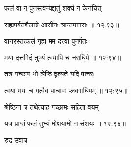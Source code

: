 {\devanagarifont फलं वा न पुनस्त्वन्यद्दातुं शक्यं न केनचित् \thinspace{\dandab} \dontdisplaylinenum }%


{\devanagarifont सह्यपर्वतशैलाग्रे आसीनः श्रान्तमानसः {॥ १२:९३॥} \veg\dontdisplaylinenum }%

{\devanagarifont वानरस्तत्फलं गृह्य मम दत्त्वा पुनर्गतः \thinspace{\dandab} \dontdisplaylinenum }%


{\devanagarifont मया दत्तमिदं तुभ्यं त्वयापि च नराधिपे {॥ १२:९४॥} \veg\dontdisplaylinenum }%

{\devanagarifont तत्र गच्छाव भो श्रेष्ठि दृश्यते यदि वानरः \thinspace{\dandab} \dontdisplaylinenum }%
 

{\devanagarifont त्वया मया च गत्वैव याचावः प्लवगाधिपम् {॥ १२:९५॥} \veg\dontdisplaylinenum }%

{\devanagarifont श्रेष्ठिना च तथेत्याह गच्छामः सहिता वयम् \thinspace{\dandab} \dontdisplaylinenum }%


{\devanagarifont यत्र प्राप्तं फलं तुभ्यं मोक्षयामो न संशयः {॥ १२:९६॥} \veg\dontdisplaylinenum }%

{\devanagarifont रुद्र उवाच {\dandab}\dontdisplaylinenum  }%
 
